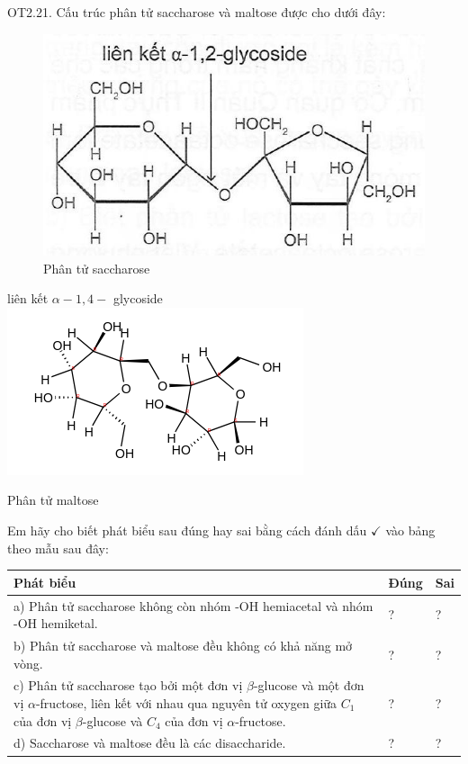 \documentclass[10pt]{article}
\begin{document}
OT2.21. Cấu trúc phân tử saccharose và maltose được cho dưới đây:

\begin{figure}[h]
\begin{center}
  \includegraphics[width=\textwidth]{2025_10_23_de6f5713836e4e91b3c8g-042}
\captionsetup{labelformat=empty}
\caption{Phân tử saccharose}
\end{center}
\end{figure}

liên kết $\alpha-1,4-$ glycoside\\
\includegraphics{smile-dafc015c8fc76769addfb07a775587d6be973dee}

Phân tử maltose

Em hãy cho biết phát biểu sau đúng hay sai bằng cách đánh dấu $\checkmark$ vào bảng theo mẫu sau đây:

\begin{center}
\begin{tabular}{|l|l|l|}
\hline
Phát biểu & Đúng & Sai \\
\hline
a) Phân tử saccharose không còn nhóm -OH hemiacetal và nhóm -OH hemiketal. & ? & ? \\
\hline
b) Phân tử saccharose và maltose đều không có khả năng mở vòng. & ? & ? \\
\hline
c) Phân tử saccharose tạo bởi một đơn vị $\beta$-glucose và một đơn vị $\alpha$-fructose, liên kết với nhau qua nguyên tử oxygen giữa $C_{1}$ của đơn vị $\beta$-glucose và $C_{4}$ của đơn vị $\alpha$-fructose. & ? & ? \\
\hline
d) Saccharose và maltose đều là các disaccharide. & ? & ? \\
\hline
\end{tabular}
\end{center}
\end{document}
